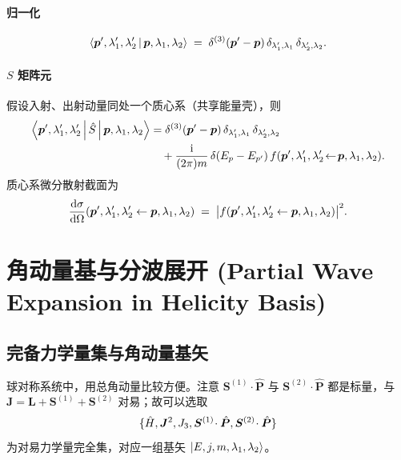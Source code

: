 \paragraph{归一化}
\begin{equation}
  \left\langle \bm p',\lambda'_1,\lambda'_2 \,\middle|\, \bm p,\lambda_1,\lambda_2 \right\rangle
  \;=\; \delta^{(3)}(\bm p'-\bm p)\,\delta_{\lambda'_1,\lambda_1}\,\delta_{\lambda'_2,\lambda_2}.
  \label{eq:hel-norm-2p}
\end{equation}

\paragraph{$S$ 矩阵元} 假设入射、出射动量同处一个质心系（共享能量壳），则
\begin{align}
  \left\langle \bm p',\lambda'_1,\lambda'_2 \,\middle|\, \hat{S} \,\middle|\, \bm p,\lambda_1,\lambda_2 \right\rangle
  &= \delta^{(3)}(\bm p'-\bm p)\,\delta_{\lambda'_1,\lambda_1}\,\delta_{\lambda'_2,\lambda_2} \notag\\
  &\quad + \frac{\mathrm{i}}{(2\pi) m}\,\delta(E_p - E_{p'})\,f(\bm p',\lambda'_1,\lambda'_2 \!\leftarrow\! \bm p,\lambda_1,\lambda_2).
  \label{eq:Smat-hel}
\end{align}
质心系微分散射截面为
\begin{equation}
  \frac{\mathrm{d}\sigma}{\mathrm{d}\Omega}(\bm p',\lambda'_1,\lambda'_2 \leftarrow \bm p,\lambda_1,\lambda_2)
  \;=\; \big|f(\bm p',\lambda'_1,\lambda'_2 \leftarrow \bm p,\lambda_1,\lambda_2)\big|^2.
  \label{eq:dsig-helicity}
\end{equation}

\section{角动量基与分波展开 (Partial Wave Expansion in Helicity Basis)}
\label{sec:hel-pw}

\subsection{完备力学量集与角动量基矢}

球对称系统中，用总角动量比较方便。注意 $\bm S^{(1)}\cdot\hat{\bm P}$ 与 $\bm S^{(2)}\cdot\hat{\bm P}$ 都是标量，与 $\bm J=\bm L+\bm S^{(1)}+\bm S^{(2)}$ 对易；故可以选取
\begin{equation}
  \{\hat{H},\bm J^2,J_3,\bm S^{(1)}\!\cdot\hat{\bm P},\bm S^{(2)}\!\cdot\hat{\bm P}\}
  \label{eq:CSCO}
\end{equation}
为对易力学量完全集，对应一组基矢 $\ket{E,j,m,\lambda_1,\lambda_2}$。

